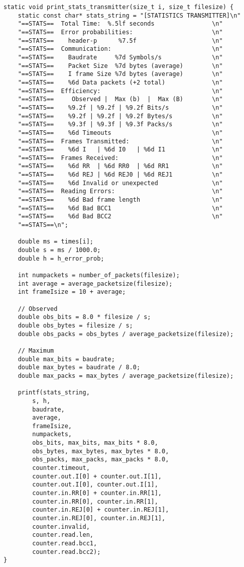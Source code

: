 \documentclass[subfiles]{main.tex}
\begin{document}
\begin{lstlisting}[style=rcom]
static void print_stats_transmitter(size_t i, size_t filesize) {
	static const char* stats_string = "[STATISTICS TRANSMITTER]\n"
	"==STATS==  Total Time:  %.5lf seconds                \n"
	"==STATS==  Error probabilities:                      \n"
	"==STATS==    header-p      %7.5f                     \n"
	"==STATS==  Communication:                            \n"
	"==STATS==    Baudrate     %7d Symbols/s              \n"
	"==STATS==    Packet Size  %7d bytes (average)        \n"
	"==STATS==    I frame Size %7d bytes (average)        \n"
	"==STATS==    %6d Data packets (+2 total)             \n"
	"==STATS==  Efficiency:                               \n"
	"==STATS==     Observed |  Max (b)  |  Max (B)        \n"
	"==STATS==    %9.2f | %9.2f | %9.2f Bits/s            \n"
	"==STATS==    %9.2f | %9.2f | %9.2f Bytes/s           \n"
	"==STATS==    %9.3f | %9.3f | %9.3f Packs/s           \n"
	"==STATS==    %6d Timeouts                            \n"
	"==STATS==  Frames Transmitted:                       \n"
	"==STATS==    %6d I   | %6d I0   | %6d I1             \n"
	"==STATS==  Frames Received:                          \n"
	"==STATS==    %6d RR  | %6d RR0  | %6d RR1            \n"
	"==STATS==    %6d REJ | %6d REJ0 | %6d REJ1           \n"
	"==STATS==    %6d Invalid or unexpected               \n"
	"==STATS==  Reading Errors:                           \n"
	"==STATS==    %6d Bad frame length                    \n"
	"==STATS==    %6d Bad BCC1                            \n"
	"==STATS==    %6d Bad BCC2                            \n"
	"==STATS==\n";
	
	double ms = times[i];
	double s = ms / 1000.0;
	double h = h_error_prob;
	
	int numpackets = number_of_packets(filesize);
	int average = average_packetsize(filesize);
	int frameIsize = 10 + average;
	
	// Observed
	double obs_bits = 8.0 * filesize / s;
	double obs_bytes = filesize / s;
	double obs_packs = obs_bytes / average_packetsize(filesize);
	
	// Maximum
	double max_bits = baudrate;
	double max_bytes = baudrate / 8.0;
	double max_packs = max_bytes / average_packetsize(filesize);
	
	printf(stats_string,
		s, h,
		baudrate,
		average,
		frameIsize,
		numpackets,
		obs_bits, max_bits, max_bits * 8.0,
		obs_bytes, max_bytes, max_bytes * 8.0,
		obs_packs, max_packs, max_packs * 8.0,
		counter.timeout,
		counter.out.I[0] + counter.out.I[1],
		counter.out.I[0], counter.out.I[1],
		counter.in.RR[0] + counter.in.RR[1],
		counter.in.RR[0], counter.in.RR[1],
		counter.in.REJ[0] + counter.in.REJ[1],
		counter.in.REJ[0], counter.in.REJ[1],
		counter.invalid,
		counter.read.len,
		counter.read.bcc1,
		counter.read.bcc2);
}


\end{lstlisting}
\end{document}
